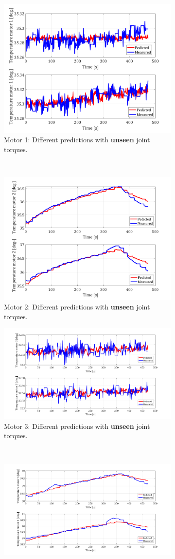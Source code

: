 \documentclass{ifacconf}
\begin{document}
\begin{figure}[t!]
	\centering
	\begin{subfigure}[t]{\columnwidth}
		\centering
		\includegraphics[height=2.in]{./pictures/applications/J1o.png}
		\caption{Motor 1: Different predictions with \textbf{unseen} joint torques.}
	\end{subfigure}%
	~ 
	\begin{subfigure}[t]{\columnwidth}
		\centering
		\includegraphics[height=2.in]{./pictures/applications/J2o.png}
		\caption{Motor 2: Different predictions with \textbf{unseen} joint torques.}
	\end{subfigure}
	\begin{subfigure}[t]{\columnwidth}
	\includegraphics[height=2.in]{./pictures/applications/J3o.png}
	\caption{Motor 3: Different predictions with \textbf{unseen} joint torques.}
\end{subfigure}%
~ 
\begin{subfigure}[t]{\columnwidth}
	\includegraphics[height=2.in]{./pictures/applications/J4o.png}

\end{subfigure}
\end{figure}
\end{document}
